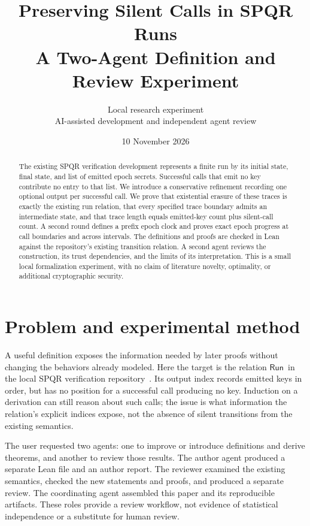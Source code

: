 \documentclass[11pt]{article}
\title{Preserving Silent Calls in SPQR Runs\\A Two-Agent Definition and Review Experiment}
\author{Local research experiment\\AI-assisted development and independent agent review}
\date{10 November 2026}
\newcommand{\Run}{\ensuremath{\mathsf{Run}}}
\begin{document}
\maketitle
\begin{abstract}
The existing SPQR verification development represents a finite run by its initial state,
final state, and list of emitted epoch secrets. Successful calls that emit no key contribute
no entry to that list. We introduce a conservative refinement recording one optional output
per successful call. We prove that existential erasure of these traces is exactly the existing
run relation, that every specified trace boundary admits an intermediate state, and that
trace length equals emitted-key count plus silent-call count. A second round defines a
prefix epoch clock and proves exact epoch progress at call boundaries and across intervals. The definitions and proofs are
checked in Lean against the repository's existing transition relation. A second agent reviews
the construction, its trust dependencies, and the limits of its interpretation. This is a
small local formalization experiment, with no claim of literature novelty, optimality, or
additional cryptographic security.
\end{abstract}

\section{Problem and experimental method}
A useful definition exposes the information needed by later proofs without changing the
behaviors already modeled. Here the target is the relation \Run\ in the local SPQR
verification repository~\cite{run}. Its output index records emitted keys in order, but has
no position for a successful call producing no key. Induction on a derivation can still
reason about such calls; the issue is what information the relation's explicit indices
expose, not the absence of silent transitions from the existing semantics.

The user requested two agents: one to improve or introduce definitions and derive theorems,
and another to review those results. The author agent produced a separate Lean file and
an author report. The reviewer examined the existing semantics, checked the new statements
and proofs, and produced a separate review. The coordinating agent assembled this paper and
its reproducible artifacts. These roles provide a review workflow, not evidence of statistical
independence or a substitute for human review.
\end{document}
